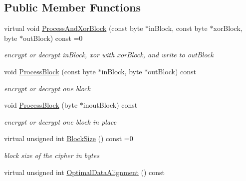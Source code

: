 \subsection*{Public Member Functions}
\begin{DoxyCompactItemize}
\item 
\hypertarget{class_block_transformation_a1904cf145e4c5c650dd7aff32f54e153}{
virtual void \hyperlink{class_block_transformation_a1904cf145e4c5c650dd7aff32f54e153}{ProcessAndXorBlock} (const byte $\ast$inBlock, const byte $\ast$xorBlock, byte $\ast$outBlock) const =0}
\label{class_block_transformation_a1904cf145e4c5c650dd7aff32f54e153}

\begin{DoxyCompactList}\small\item\em encrypt or decrypt inBlock, xor with xorBlock, and write to outBlock \item\end{DoxyCompactList}\item 
void \hyperlink{class_block_transformation_a2fefb3f4c6c6297c0c91fcbba9e4f4f3}{ProcessBlock} (const byte $\ast$inBlock, byte $\ast$outBlock) const 
\begin{DoxyCompactList}\small\item\em encrypt or decrypt one block \item\end{DoxyCompactList}\item 
\hypertarget{class_block_transformation_a12cc1846de571557be0f82471e8904bf}{
void \hyperlink{class_block_transformation_a12cc1846de571557be0f82471e8904bf}{ProcessBlock} (byte $\ast$inoutBlock) const }
\label{class_block_transformation_a12cc1846de571557be0f82471e8904bf}

\begin{DoxyCompactList}\small\item\em encrypt or decrypt one block in place \item\end{DoxyCompactList}\item 
\hypertarget{class_block_transformation_adfdb78b033996020435c3dcffdca76ce}{
virtual unsigned int \hyperlink{class_block_transformation_adfdb78b033996020435c3dcffdca76ce}{BlockSize} () const =0}
\label{class_block_transformation_adfdb78b033996020435c3dcffdca76ce}

\begin{DoxyCompactList}\small\item\em block size of the cipher in bytes \item\end{DoxyCompactList}\item 
\hypertarget{class_block_transformation_a4f70aa5ace37f586cecda0a24f5455a6}{
virtual unsigned int \hyperlink{class_block_transformation_a4f70aa5ace37f586cecda0a24f5455a6}{OptimalDataAlignment} () const }
\label{class_block_transformation_a4f70aa5ace37f586cecda0a24f5455a6}


\end{DoxyCompactItemize}
